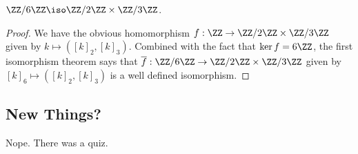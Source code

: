 \begin{ex}
$\ZZ / 6 \ZZ \iso \ZZ / 2 \ZZ \times \ZZ / 3 \ZZ$.
\end{ex}

\begin{proof}
We have the obvious
homomorphism $f : \ZZ \to \ZZ / 2 \ZZ \times \ZZ / 3 \ZZ$ given by $k
\mapsto ([k]_2, [k]_3)$. Combined with the fact that $\ker f = 6\ZZ$,
the first isomorphism theorem says that $\overline{f} : \ZZ / 6 \ZZ \to
\ZZ / 2 \ZZ \times \ZZ / 3 \ZZ$ given by $[k]_6 \mapsto ([k]_2, [k]_3)$
is a well defined isomorphism.
\end{proof}

\subsection{New Things?}
Nope. There was a quiz.
